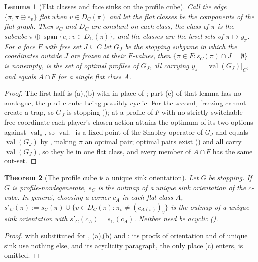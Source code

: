 \documentclass[11pt]{article}
\theoremstyle{plain}
\newtheorem{theorem}{Theorem}[section]
\newtheorem{lemma}[theorem]{Lemma}
\theoremstyle{definition}
\DeclareMathOperator{\val}{val}
\begin{document}
\begin{lemma}[Flat classes and face sinks on the profile cube]\label{lem:profile-faces}
Call the edge $\{\pi,\pi\oplus e_v\}$ flat when $v\in D_C(\pi)$ and let
the flat classes be the components of the flat graph. Then $s_C$ and
$D_C$ are constant on each class, the class of $\pi$ is the subcube
$\pi\oplus\operatorname{span}\{e_v:v\in D_C(\pi)\}$, and the classes are
the level sets of $\pi\mapsto y_\pi$. For a face $F$ with free set
$J\subseteq C$ let $G_J$ be the stopping subgame in which the coordinates
outside $J$ are frozen at their $F$-values; then
$\{\pi\in F:s_C(\pi)\cap J=\emptyset\}$ is nonempty, is the set of optimal
profiles of $G_J$, all carrying $y_\pi=\val(G_J)|_C$, and equals $A\cap F$
for a single flat class $A$.
\end{lemma}

\begin{proof}
The first half is (a),(b) with
 in place of ; part (c)
of that lemma has no analogue, the profile cube being possibly cyclic.
For the second, freezing cannot create a trap, so $G_J$ is stopping
(); at a profile of $F$ with no strictly switchable free
coordinate each player's chosen action attains the optimum of its two
options against $\val_\pi$, so $\val_\pi$ is a fixed point of the Shapley
operator of $G_J$ and equals $\val(G_J)$ by , making
$\pi$ an optimal pair; optimal pairs exist
() and all carry $\val(G_J)$, so they lie in
one flat class, and every member of $A\cap F$ has the same out-set.
\end{proof}

\begin{theorem}[The profile cube is a unique sink orientation]\label{thm:profile-uso}
Let $G$ be stopping. If $G$ is profile-nondegenerate, $s_C$ is the outmap
of a unique sink orientation of the $c$-cube. In general, choosing a
corner $c_A$ in each flat class $A$,
$s'_C(\pi):=s_C(\pi)\cup\{v\in D_C(\pi):\pi_v\ne(c_{A(\pi)})_v\}$ is the
outmap of a unique sink orientation with $s'_C(c_A)=s_C(c_A)$. Neither
need be acyclic ().
\end{theorem}

\begin{proof}
 with 
substituted for , (a),(b) and
: its proofs of orientation and of unique sink use
nothing else, and its acyclicity paragraph, the only place
(c) enters, is omitted.
\end{proof}
\end{document}
